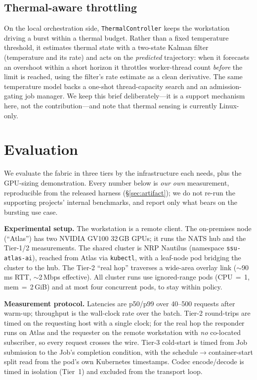 \documentclass[conference]{IEEEtran}
\begin{document}
\subsection{Thermal-aware throttling}
On the local orchestration side, \texttt{ThermalController} keeps the workstation driving a burst
within a thermal budget. Rather than a fixed temperature threshold, it estimates thermal state
with a two-state Kalman filter~\cite{kalman} (temperature and its rate) and acts on the
\emph{predicted} trajectory: when it forecasts an overshoot within a short horizon it throttles
worker-thread count \emph{before} the limit is reached, using the filter's rate estimate as a clean
derivative. The same temperature model backs a one-shot thread-capacity search and an
admission-gating job manager. We keep this brief deliberately---it is a support mechanism here, not
the contribution---and note that thermal sensing is currently Linux-only.

\section{Evaluation}\label{sec:eval}
We evaluate the fabric in three tiers by the infrastructure each needs, plus the GPU-sizing
demonstration. Every number below is \emph{our own} measurement, reproducible from the released
harness (\S\ref{sec:artifact}); we do not re-run the supporting projects' internal benchmarks, and
report only what bears on the bursting use case.

\textbf{Experimental setup.} The workstation is a remote client. The on-premises node (``Atlas'')
has two NVIDIA GV100 32\,GB GPUs; it runs the NATS hub and the Tier-1/2 measurements. The shared
cluster is NRP Nautilus (namespace \texttt{ssu-atlas-ai}), reached from Atlas via \texttt{kubectl},
with a leaf-node pod bridging the cluster to the hub. The Tier-2 ``real hop'' traverses a
wide-area overlay link ($\sim$90\,ms RTT, $\sim$2\,Mbps effective). All cluster runs use
ignored-range pods (CPU\,$=$\,1, mem\,$=$\,2\,GiB) and at most four concurrent pods, to stay within
policy.

\textbf{Measurement protocol.} Latencies are p50/p99 over 40--500 requests after warm-up;
throughput is the wall-clock rate over the batch. Tier-2 round-trips are timed on the requesting
host with a single clock; for the real hop the responder runs on Atlas and the requester on the
remote workstation with \emph{no} co-located subscriber, so every request crosses the wire. Tier-3
cold-start is timed from Job submission to the Job's completion condition, with the
schedule$\to$container-start split read from the pod's own Kubernetes timestamps. Codec
encode/decode is timed in isolation (Tier~1) and excluded from the transport loop.
\end{document}
